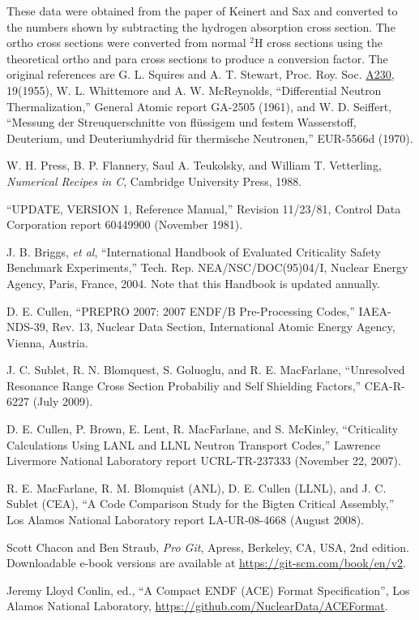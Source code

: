\documentclass[11pt,twoside]{NJOYMan}
\begin{document}
\begin{thebibliography}{99}
\begin{singlespace}
 These data were obtained from the paper of Keinert
  and Sax\cite{Keinert} and converted to the numbers shown by
  subtracting the hydrogen absorption cross section.  The ortho
  cross sections were converted from normal $^{2}$H cross sections
  using the theoretical ortho and para cross sections to produce
  a conversion factor.  The original references are G. L. Squires
  and A. T. Stewart, Proc. Roy. Soc. \underline{A230}, 19(1955),
  W. L. Whittemore and A. W. McReynolds, ``Differential Neutron
  Thermalization,'' General Atomic report GA-2505 (1961), and
  W. D. Seiffert, ``Messung der Streuquerschnitte von fl\"{u}ssigem
  und festem Wasserstoff, Deuterium, und Deuteriumhydrid f\"{u}r
  thermische Neutronen,'' EUR-5566d (1970).

 W. H. Press, B. P. Flannery, Saul A. Teukolsky,
  and William T. Vetterling, {\it Numerical Recipes in C}, Cambridge
  University Press, 1988.

 ``UPDATE, VERSION 1, Reference Manual,''
  Revision 11/23/81, Control Data Corporation report 60449900
  (November 1981).

 J. B. Briggs, {\it et al}, ``International Handbook
  of Evaluated Criticality Safety Benchmark Experiments,'' Tech. Rep.
  NEA/NSC/DOC(95)04/I, Nuclear Energy Agency, Paris, France, 2004.  Note
  that this Handbook is updated annually.

 D. E. Cullen, ``PREPRO 2007: 2007 ENDF/B Pre-Processing
  Codes,'' IAEA-NDS-39, Rev. 13, Nuclear Data Section, International
  Atomic Energy Agency, Vienna, Austria.

 J. C. Sublet, R. N. Blomquest,
  S. Goluoglu, and R. E. MacFarlane, ``Unresolved Resonance
  Range Cross Section Probabiliy and Self Shielding Factors,''
  CEA-R-6227 (July 2009).

 D. E. Cullen, P. Brown, E. Lent,
  R. MacFarlane, and S. McKinley, ``Criticality Calculations
  Using LANL and LLNL Neutron Transport Codes,'' Lawrence Livermore
  National Laboratory report UCRL-TR-237333 (November 22, 2007).

 R. E. MacFarlane, R. M. Blomquist (ANL),
  D. E. Cullen (LLNL), and J. C. Sublet (CEA),
  ``A Code Comparison Study for the Bigten Critical Assembly,''
  Los Alamos National Laboratory report LA-UR-08-4668 (August 2008).

 Scott Chacon and Ben Straub, {\it Pro Git}, Apress,
  Berkeley, CA, USA, 2nd edition.  Downloadable e-book versions
  are available at \url{https://git-scm.com/book/en/v2}.

 Jeremy Lloyd Conlin, ed., ``A Compact ENDF (ACE) Format Specification'', Los Alamos National Laboratory, \url{https://github.com/NuclearData/ACEFormat}.

\end{singlespace}
\end{thebibliography}

\cleardoublepage

\printindex
\end{document}
